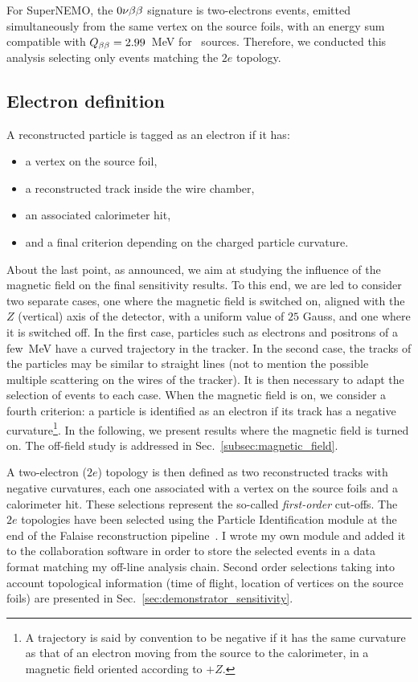 For SuperNEMO, the $0\nu\beta\beta$ signature is two-electrons events, emitted simultaneously from the same vertex on the source foils, with an energy sum compatible with $Q_{\beta\beta} = 2.99$~MeV for \Se\ sources.
Therefore, we conducted this analysis selecting only events matching the $2e$ topology.

\subsection{Electron definition}

A reconstructed particle is tagged as an electron if it has:
\begin{itemize}
\item a vertex on the source foil,
\item a reconstructed track inside the wire chamber,
\item an associated calorimeter hit,
\item and a final criterion depending on the charged particle curvature.
\end{itemize}
About the last point, as announced, we aim at studying the influence of the magnetic field on the final sensitivity results.
To this end, we are led to consider two separate cases, one where the magnetic field is switched on, aligned with the $Z$ (vertical) axis of the detector, with a uniform value of $25$ Gauss, and one where it is switched off.
In the first case, particles such as electrons and positrons of a few~MeV have a curved trajectory in the tracker.
In the second case, the tracks of the particles may be similar to straight lines (not to mention the possible multiple scattering on the wires of the tracker).
It is then necessary to adapt the selection of events to each case.
When the magnetic field is on, we consider a fourth criterion: a particle is identified as an electron if its track has a negative curvature\footnote{A trajectory is said by convention to be negative if it has the same curvature as that of an electron moving from the source to the calorimeter, in a magnetic field oriented according to $+Z$.}.
In the following, we present results where the magnetic field is turned on.
The off-field study is addressed in Sec.~\ref{subsec:magnetic_field}.

A two-electron ($2e$) topology is then defined as two reconstructed tracks with negative curvatures, each one associated with a vertex on the source foils and a calorimeter hit.
These selections represent the so-called \emph{first-order} cut-offs.
The $2e$ topologies have been selected using the Particle Identification module at the end of the Falaise reconstruction pipeline~\cite{CalvezThesis}.
I wrote my own module and added it to the collaboration software in order to store the selected events in a data format matching my off-line analysis chain.
Second order selections taking into account topological information (time of flight, location of vertices on the source foils) are presented in Sec.~\ref{sec:demonstrator_sensitivity}.

